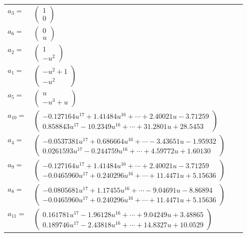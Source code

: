 \documentclass[1p]{elsarticle_modified}
\theoremstyle{definition}
\begin{document}
\begin{tabular}{m{7pt} m{180pt} m{7pt} m{180pt} }
\flushright $a_{3}=$&$\begin{pmatrix}1\\0\end{pmatrix}$ \\
\flushright $a_{6}=$&$\begin{pmatrix}0\\u\end{pmatrix}$ \\
\flushright $a_{2}=$&$\begin{pmatrix}1\\- u^2\end{pmatrix}$ \\
\flushright $a_{1}=$&$\begin{pmatrix}- u^2+1\\- u^2\end{pmatrix}$ \\
\flushright $a_{5}=$&$\begin{pmatrix}u\\- u^3+u\end{pmatrix}$ \\
\flushright $a_{10}=$&$\begin{pmatrix}-0.127164 u^{17}+1.41484 u^{16}+\cdots+2.40021 u-3.71259\\0.858843 u^{17}-10.2349 u^{16}+\cdots+31.2801 u+28.5453\end{pmatrix}$ \\
\flushright $a_{4}=$&$\begin{pmatrix}-0.0537381 u^{17}+0.686664 u^{16}+\cdots-3.43651 u-1.95932\\0.0261593 u^{17}-0.244759 u^{16}+\cdots+4.59772 u+1.60130\end{pmatrix}$ \\
\flushright $a_{9}=$&$\begin{pmatrix}-0.127164 u^{17}+1.41484 u^{16}+\cdots+2.40021 u-3.71259\\-0.0465960 u^{17}+0.240296 u^{16}+\cdots+11.4471 u+5.15636\end{pmatrix}$ \\
\flushright $a_{8}=$&$\begin{pmatrix}-0.0805681 u^{17}+1.17455 u^{16}+\cdots-9.04691 u-8.86894\\-0.0465960 u^{17}+0.240296 u^{16}+\cdots+11.4471 u+5.15636\end{pmatrix}$ \\
\flushright $a_{11}=$&$\begin{pmatrix}0.161781 u^{17}-1.96128 u^{16}+\cdots+9.04249 u+3.48865\\0.189746 u^{17}-2.43818 u^{16}+\cdots+14.8327 u+10.0529\end{pmatrix}$ \\

\end{tabular}
\end{document}
